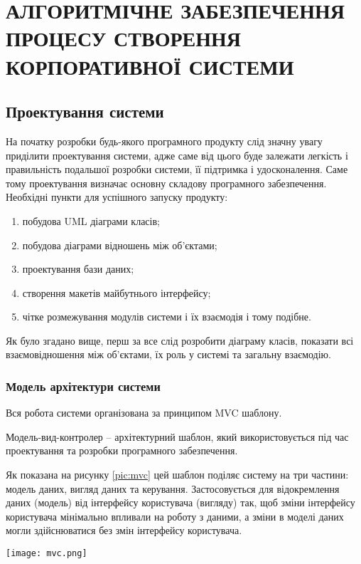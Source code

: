 \section{АЛГОРИТМІЧНЕ ЗАБЕЗПЕЧЕННЯ ПРОЦЕСУ СТВОРЕННЯ КОРПОРАТИВНОЇ СИСТЕМИ}

\subsection{Проектування системи}
На початку розробки будь-якого програмного продукту слід значну увагу приділити проектування системи, адже саме від цього буде залежати легкість і правильність подальшої розробки системи, її підтримка і удосконалення.
Саме тому проектування визначає основну складову програмного забезпечення. 
Необхідні пункти для успішного запуску  продукту:
\begin{enumerate}
	\item побудова UML діаграми класів;
	\item побудова діаграми відношень між об'єктами;
	\item проектування бази даних;
	\item створення макетів майбутнього інтерфейсу;
	\item чітке розмежування модулів системи і їх взаємодія і тому подібне.
\end{enumerate}

\par Як було згадано вище, перш за все слід розробити діаграму класів, показати всі взаємовідношення між об'єктами, їх роль у системі та загальну взаємодію.
\subsubsection{Модель архітектури системи}
Вся робота системи організована за принципом MVC шаблону.
\par Модель-вид-контролер -- архітектурний шаблон, який використовується під час проектування та розробки програмного забезпечення.
\par Як показана на рисунку \ref{pic:mvc} цей шаблон поділяє систему на три частини: модель даних, вигляд даних та керування. Застосовується для відокремлення даних (модель) від інтерфейсу користувача (вигляду) так, щоб зміни інтерфейсу користувача мінімально впливали на роботу з даними, а зміни в моделі даних могли здійснюватися без змін інтерфейсу користувача.

\begin{center}
		\texttt{[image: mvc.png]}
		\label{pic:mvc}
\end{center}

